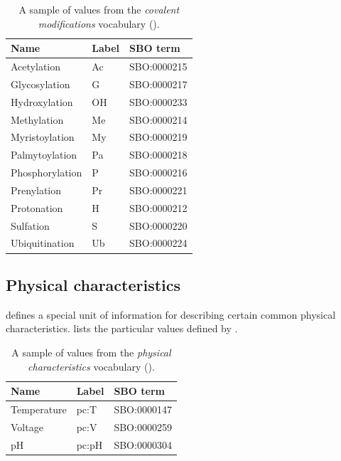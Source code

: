 \begin{table}[h]
  \centering
  \begin{tabular}{l>{\ttfamily}l>{\ttfamily}l}
    \toprule
    \textbf{Name}   & \textbf{\rmfamily Label} & \textbf{\rmfamily SBO term} \\
    \midrule
    Acetylation     & Ac    & SBO:0000215\\
    Glycosylation   & G     & SBO:0000217\\
    Hydroxylation   & OH    & SBO:0000233\\
    Methylation     & Me    & SBO:0000214\\
    Myristoylation  & My    & SBO:0000219\\
    Palmytoylation  & Pa    & SBO:0000218\\
    Phosphorylation & P     & SBO:0000216\\
    Prenylation     & Pr    & SBO:0000221\\
    Protonation     & H     & SBO:0000212\\
    Sulfation       & S     & SBO:0000220\\
    Ubiquitination  & Ub    & SBO:0000224\\
    \bottomrule
  \end{tabular}
  \caption{A sample of values from the \emph{covalent modifications} vocabulary
    ().}
  \label{tab:covalent-mod-cv}
\end{table}


\subsection{Physical characteristics}
\label{sec:physical-characteristics-cv}

\SBGNPDLone defines a special unit of information for describing
certain common physical characteristics.
 lists the particular values defined
by \SBGNPDLone.


\begin{table}[h]
  \centering
  \begin{tabular}{l>{\ttfamily}l>{\ttfamily}l}
    \toprule
    \textbf{Name}   & \textbf{\rmfamily Label} & \textbf{\rmfamily SBO term} \\
    \midrule
    Temperature   & pc:T  & SBO:0000147\\
    Voltage       & pc:V  & SBO:0000259\\
    pH            & pc:pH & SBO:0000304\\
    \bottomrule
  \end{tabular}
  \caption{A sample of values from the \emph{physical
      characteristics} vocabulary ().}
  \label{tab:physical-characteristics-cv}
\end{table}

